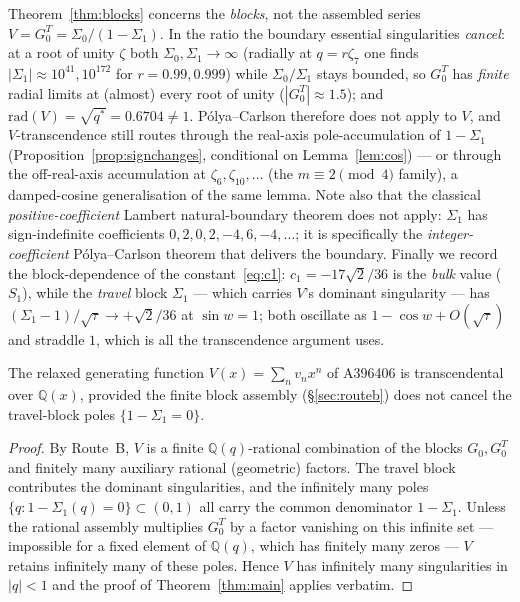 \begin{remark}
\label{rem:blockscope}
Theorem~\ref{thm:blocks} concerns the \emph{blocks}, not the assembled series
$V=G^{T}_0=\Sigma_0/(1-\Sigma_1)$. In the ratio the boundary essential singularities
\emph{cancel}: at a root of unity $\zeta$ both $\Sigma_0,\Sigma_1\to\infty$ (radially at
$q=r\zeta_7$ one finds $|\Sigma_1|\approx10^{41},10^{172}$ for $r=0.99,0.999$) while
$\Sigma_0/\Sigma_1$ stays bounded, so $G^{T}_0$ has \emph{finite} radial limits at
\textup(almost\textup) every root of unity ($|G^{T}_0|\approx1.5$); and
$\mathrm{rad}(V)=\sqrt{q^{\ast}}=0.6704\ne1$. P\'olya--Carlson therefore does not apply
to $V$, and $V$-transcendence still routes through the real-axis pole-accumulation of
$1-\Sigma_1$ (Proposition~\ref{prop:signchanges}, conditional on Lemma~\ref{lem:cos})
--- or through the off-real-axis accumulation at $\zeta_6,\zeta_{10},\dots$ (the
$m\equiv2\pmod4$ family), a damped-cosine generalisation of the same lemma. Note also
that the classical \emph{positive-coefficient} Lambert natural-boundary theorem does not
apply: $\Sigma_1$ has sign-indefinite coefficients $0,2,0,2,-4,6,-4,\dots$; it is
specifically the \emph{integer-coefficient} P\'olya--Carlson theorem that delivers the
boundary. Finally we record the block-dependence of the constant~\eqref{eq:c1}:
$c_1=-17\sqrt2/36$ is the \emph{bulk} value ($S_1$), while the \emph{travel} block
$\Sigma_1$ --- which carries $V$'s dominant singularity --- has
$(\Sigma_1-1)/\sqrt\tau\to+\sqrt2/36$ at $\sin w=1$; both oscillate as $1-\cos
w+O(\sqrt\tau)$ and straddle $1$, which is all the transcendence argument uses.
\end{remark}

\begin{corollary}\label{cor:V}
The relaxed generating function $V(x)=\sum_n v_n x^{n}$ of A396406 is
transcendental over $\mathbb Q(x)$, provided the finite block assembly
\textup(\S\ref{sec:routeb}\textup) does not cancel the travel-block poles
$\{1-\Sigma_1=0\}$.
\end{corollary}

\begin{proof}
By Route~B, $V$ is a finite $\mathbb Q(q)$-rational combination of the blocks
$G_0,G^{T}_0$ and finitely many auxiliary rational (geometric) factors. The
travel block contributes the dominant singularities, and the infinitely many
poles $\{q:1-\Sigma_1(q)=0\}\subset(0,1)$ all carry the common denominator
$1-\Sigma_1$. Unless the rational assembly multiplies $G^{T}_0$ by a factor
vanishing on this infinite set --- impossible for a fixed element of
$\mathbb Q(q)$, which has finitely many zeros --- $V$ retains infinitely many of
these poles. Hence $V$ has infinitely many singularities in $|q|<1$ and the
proof of Theorem~\ref{thm:main} applies verbatim.
\end{proof}

